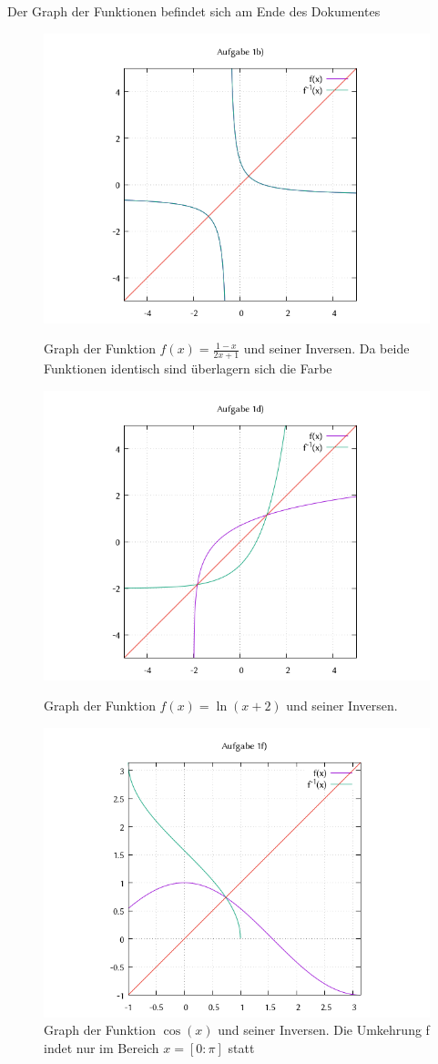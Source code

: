 \documentclass[18pt, 4paper]{article}
\begin{document}
Der Graph der Funktionen befindet sich am Ende des Dokumentes
\newpage
\begin{figure}
	\centering
	\includegraphics[scale=0.4]{images/Aufgabe2.png}
	\caption{Graph der Funktion $f(x)=\frac{1-x}{2x+1}$ und seiner Inversen. Da beide 			Funktionen identisch sind überlagern sich die Farbe}
	\includegraphics[scale=0.4]{images/Aufgabe3.png}
	\caption{Graph der Funktion $f(x)=\ln(x+2)$ und seiner Inversen.}
	\includegraphics[scale=0.4]{images/Aufgabe4.png}
	\caption{Graph der Funktion $\cos(x)$ und seiner Inversen. Die Umkehrung f				indet nur im Bereich $x= [0:\pi]$ statt}
\end{figure}
\end{document}
